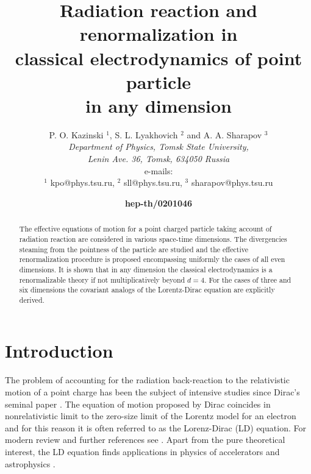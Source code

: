 \documentclass[a4paper,12pt]{article}
\title{\bf Radiation reaction and renormalization
in \\classical electrodynamics of point particle\\   in any
dimension}
\author{P. O. Kazinski ${}^1$,
S. L. Lyakhovich ${}^2$
and A. A. Sharapov ${}^3$\protect\\
{\it Department of Physics, Tomsk State University,}\\
{\it Lenin Ave. 36, Tomsk, 634050 Russia}\\
e-mails: \\{${}^1$ kpo@phys.tsu.ru, ${}^2$ sll@phys.tsu.ru,
${}^3$ sharapov@phys.tsu.ru }}
\date{{\bf hep-th/0201046}}
\begin{document}
\def\thesection{\arabic{section}}
\def\theequation{\arabic{equation}}

\maketitle


\begin{abstract}
The effective equations of motion for a point charged particle taking
account of radiation reaction are considered in various space-time
dimensions. The divergencies steaming from the pointness of the particle are
studied and the effective renormalization procedure is proposed encompassing
uniformly the cases of all even dimensions. It is shown that in any
dimension the classical electrodynamics is a renormalizable theory if not
multiplicatively beyond $d=4$. For the cases of three and six dimensions the
covariant analogs of the Lorentz-Dirac equation are explicitly derived.
\end{abstract}


\section{ Introduction}

The problem of accounting for the radiation back-reaction to the
relativistic motion of a point charge has been the subject of intensive
studies since Dirac's seminal paper \cite{Dirac}. The equation of motion
proposed by Dirac coincides in nonrelativistic limit to the zero-size limit
of the Lorentz model for an electron \cite{Lorentz} and for this reason it
is often referred to as the Lorenz-Dirac (LD) equation. For modern review
and further references see \cite{LL,Jackson,TVW,Poisson,Edgren}. Apart from
the pure theoretical interest, the LD equation finds applications in physics
of accelerators and astrophysics \cite{LT}.
\end{document}
